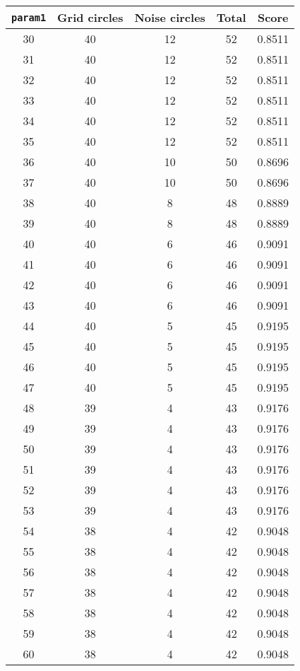 \documentclass[letterpaper, 12pt]{article}
\begin{document}
\begin{longtable}{|c|c|c|c|c|}
\hline
\textbf{\texttt{param1}} & \textbf{Grid circles} & \textbf{Noise circles} & \textbf{Total} & \textbf{Score} \\
\hline
30 & 40 & 12 & 52 & 0.8511 \\
\hline
31 & 40 & 12 & 52 & 0.8511 \\
\hline
32 & 40 & 12 & 52 & 0.8511 \\
\hline
33 & 40 & 12 & 52 & 0.8511 \\
\hline
34 & 40 & 12 & 52 & 0.8511 \\
\hline
35 & 40 & 12 & 52 & 0.8511 \\
\hline
36 & 40 & 10 & 50 & 0.8696 \\
\hline
37 & 40 & 10 & 50 & 0.8696 \\
\hline
38 & 40 & 8 & 48 & 0.8889 \\
\hline
39 & 40 & 8 & 48 & 0.8889 \\
\hline
40 & 40 & 6 & 46 & 0.9091 \\
\hline
41 & 40 & 6 & 46 & 0.9091 \\
\hline
42 & 40 & 6 & 46 & 0.9091 \\
\hline
43 & 40 & 6 & 46 & 0.9091 \\
\hline
44 & 40 & 5 & 45 & 0.9195 \\
\hline
45 & 40 & 5 & 45 & 0.9195 \\
\hline
46 & 40 & 5 & 45 & 0.9195 \\
\hline
47 & 40 & 5 & 45 & 0.9195 \\
\hline
48 & 39 & 4 & 43 & 0.9176 \\
\hline
49 & 39 & 4 & 43 & 0.9176 \\
\hline
50 & 39 & 4 & 43 & 0.9176 \\
\hline
51 & 39 & 4 & 43 & 0.9176 \\
\hline
52 & 39 & 4 & 43 & 0.9176 \\
\hline
53 & 39 & 4 & 43 & 0.9176 \\
\hline
54 & 38 & 4 & 42 & 0.9048 \\
\hline
55 & 38 & 4 & 42 & 0.9048 \\
\hline
56 & 38 & 4 & 42 & 0.9048 \\
\hline
57 & 38 & 4 & 42 & 0.9048 \\
\hline
58 & 38 & 4 & 42 & 0.9048 \\
\hline
59 & 38 & 4 & 42 & 0.9048 \\
\hline
60 & 38 & 4 & 42 & 0.9048 \\
\hline

\end{longtable}
\end{document}
